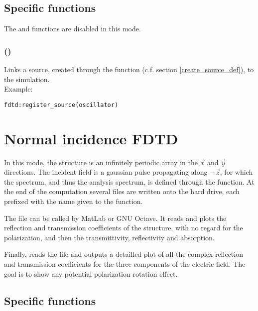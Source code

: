 \subsection{Specific functions}

The  and  functions are disabled in this mode.

\subsubsection[register\_source]{()}

Links a source, created through the  function (c.f. section \ref{create_source_def}), to the simulation. \\ Example:

\begin{lstlisting}
fdtd:register_source(oscillator)
\end{lstlisting}

\section{Normal incidence FDTD}

In this mode, the structure is an infinitely periodic array in the $\vec x$ and $\vec y$ directions. The incident field is a gaussian pulse propagating along $-\vec z$, for which the spectrum, and thus the analysis spectrum, is defined through the  function. At the end of the computation several files are written onto the hard drive, each prefixed with the name given to the  function.
	
	The  file can be called by MatLab or GNU Octave. It reads  and plots the reflection and transmission coefficients of the structure, with no regard for the polarization, and then the transmittivity, reflectivity and absorption.
	
	Finally,  reads the  file and outputs a detailled plot of all the complex reflection and transmission coefficients for the three components of the electric field. The goal is to show any potential polarization rotation effect.

\subsection{Specific functions}

